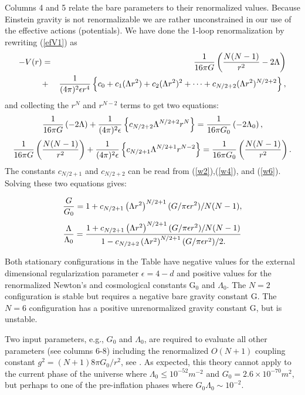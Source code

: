 \documentclass[a4paper,aps,preprint,groupedaddress,showpacs]{revtex4}
\begin{document}
Columns 4 and 5 relate the bare parameters to their renormalized 
values. 
Because Einstein gravity is not renormalizable we are rather  
unconstrained in our use of the effective actions (potentials).
We have done the 1-loop renormalization by rewriting (\ref{efV1}) as
\begin{eqnarray} 
-V(r)&=& {1\over 16\pi G}\left({N(N-1)\over r^2}-2\Lambda\right)
\nonumber\\
&+&{1 \over (4\pi)^2\epsilon r^4}\left\{ 
c_0+c_1(\Lambda r^2)+c_2(\Lambda r^2)^2+\cdots+c_{N/2+2}(\Lambda r^2)^{N/2+2}\right\}, 
\label{efV2}
\end{eqnarray}
and collecting the $r^{N}$ and $r^{N-2}$ terms to get two equations:
\begin{equation} 
{1\over 16\pi G}\left(-2\Lambda\right) +{1 \over (4\pi)^2\epsilon}
\left\{c_{N/2+2} \Lambda^{N/2+2}r^N \right\}=
{1\over 16\pi G_0}\left(-2\Lambda_0\right),
\label{c2}
\end{equation}
\begin{equation} 
{1\over 16\pi G}\left({N(N-1)\over r^2}\right) 
+{1 \over (4\pi)^2\epsilon}\left\{c_{N/2+1} \Lambda^{N/2+1}r^{N-2} \right\}=
{1\over 16\pi G_0}\left({N(N-1)\over r^2}\right).
\label{c1}
\end{equation}
The constants 
$c_{N/2+1}$ and $c_{N/2+2}$ can be read from (\ref{w2}),(\ref{w4}), and (\ref{w6}).
Solving these two equations gives:

\begin{equation} 
{G\over G_0}=1+c_{N/2+1}\left(\Lambda r^2\right)^{N/2+1} 
(G/\pi\epsilon r^2)/N(N-1),
\label{G}
\end{equation}
\begin{equation} 
{\Lambda\over\Lambda_0}={
1+c_{N/2+1}\left(\Lambda r^2\right)^{N/2+1} 
(G/\pi\epsilon r^2)/N(N-1)
\over
1-c_{N/2+2}\left(\Lambda r^2\right)^{N/2+1} 
(G/\pi\epsilon r^2)/2.
}
\label{Lambda}
\end{equation}

Both stationary configurations in the Table have negative values for the 
external dimensional regularization parameter 
$\epsilon=4-d$ and positive values for the renormalized Newton's and cosmological 
constants G$_0$ and $\Lambda_0$. 
The $N=2$ configuration is stable but requires a negative bare 
gravity constant G. The $N=6$ configuration has
a positive unrenormalized gravity constant G, but is unstable.


Two input parameters, e.g., $G_0$ and $\Lambda_0$, are required to evaluate all 
other parameters (see columns 6-8) including the renormalized $O(N+1)$ 
coupling constant $g^2=(N+1)8\pi G_0/r^2$, see \cite{CW}. As expected, this theory 
cannot apply to the current phase of the universe where $\Lambda_0\le 10^{-52} m^{-2}$
and $G_0= 2.6\times 10^{-70} m^2$, but perhaps to one of the 
pre-inflation phases where $G_0\Lambda_0\sim 10^{-2}$.
\end{document}
